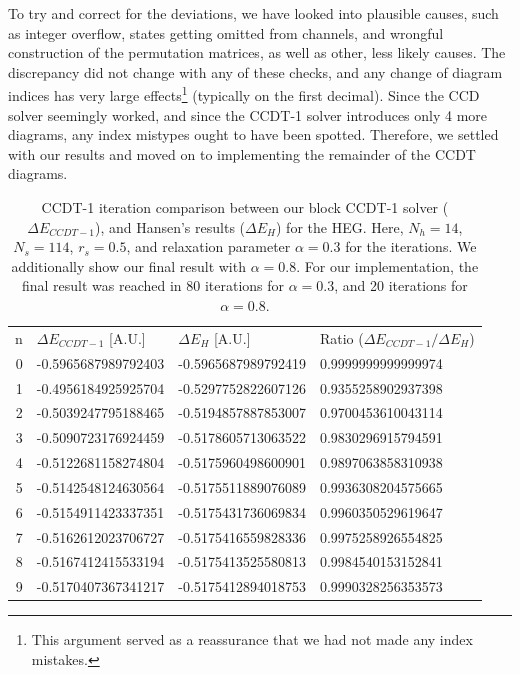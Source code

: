 \documentclass[10pt,twoside]{report}
\begin{document}
	To try and correct for the deviations, we have looked into plausible causes, such as integer overflow, states getting omitted from channels, and wrongful construction of the permutation matrices, as well as other, less likely causes. The discrepancy did not change with any of these checks, and any change of diagram indices has very large effects\footnote{This argument served as a reassurance that we had not made any index mistakes.} (typically on the first decimal). Since the CCD solver seemingly worked, and since the CCDT-1 solver introduces only 4 more diagrams, any index mistypes ought to have been spotted. Therefore, we settled with our results and moved on to implementing the remainder of the CCDT diagrams.
	
	\begin{table}
		\centering
		\captionsetup{width=.8\textwidth}
		\caption{CCDT-1 iteration comparison between our block CCDT-1 solver ($\Delta E_{CCDT-1}$), and Hansen's results ($\Delta E_{H}$) \cite{Hansen15} for the HEG. Here, $N_h=14$, $N_s=114$, $r_s=0.5$, and relaxation parameter $\alpha=0.3$ for the iterations. We additionally show our final result with $\alpha=0.8$. For our implementation, the final result was reached in 80 iterations for $\alpha=0.3$, and 20 iterations for $\alpha=0.8$.}
		\begin{tabular}{rlll}
			n & $\Delta E_{CCDT-1}$ [A.U.] & $\Delta E_{H}$ [A.U.] \cite{Hansen15} & Ratio ($\Delta E_{CCDT-1}/\Delta E_{H}$)\\
			0 & -0.5965687989792403 & -0.5965687989792419 & 0.9999999999999974\\
			1 & -0.4956184925925704 & -0.5297752822607126 & 0.9355258902937398\\
			2 & -0.5039247795188465 & -0.5194857887853007 & 0.9700453610043114\\
			3 & -0.5090723176924459 & -0.5178605713063522 & 0.9830296915794591\\
			4 & -0.5122681158274804 & -0.5175960498600901 & 0.9897063858310938\\
			5 & -0.5142548124630564 & -0.5175511889076089 & 0.9936308204575665\\
			6 & -0.5154911423337351 & -0.5175431736069834 & 0.9960350529619647\\
			7 & -0.5162612023706727 & -0.5175416559828336 & 0.9975258926554825\\
			8 & -0.5167412415533194 & -0.5175413525580813 & 0.9984540153152841\\
			9 & -0.5170407367341217 & -0.5175412894018753 & 0.9990328256353573\\

\end{tabular}
\end{table}
\end{document}
